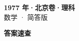 \documentclass[zihao=-4, a4paper]{ctexart}
\begin{document}
\begin{center}
  {\Large\bfseries 1977 年·北京卷·理科}\\[4pt]
  {\large 数学 · 简答版}
\end{center}
\medskip
{}

\clearpage
{}
\begin{center}{\Large\bfseries 答案速查}\end{center}
\medskip

\end{document}
